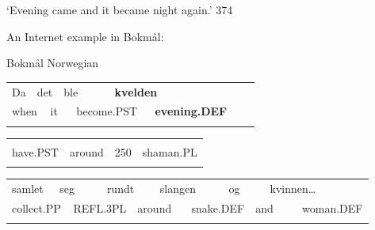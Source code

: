 \begin{styleTranslation}
‘Evening came and it became night again.’ 374

\end{styleTranslation}

An Internet example in Bokmål: 

\begin{listWWNumileveli}
\item 

\begin{styleExample}
Bokmål Norwegian

\end{styleExample}

\end{listWWNumileveli}

\begin{tabular}{llllllllll}
\lsptoprule
Da & \multicolumn{2}{l}{det

} & \multicolumn{2}{l}{ble

} & \multicolumn{2}{l}{{\bfseries kvelden}

} & \multicolumn{2}{l}{} & \\
\multicolumn{2}{l}{when

} & \multicolumn{2}{l}{it

} & \multicolumn{2}{l}{become.PST

} & \multicolumn{2}{l}{{\bfseries evening.DEF}

} & \multicolumn{2}{l}{}\\
\lspbottomrule
\end{tabular}

\begin{tabular}{llll}
\lsptoprule
\multicolumn{4}{l}{hadde

}\\
have.PST & around & 250 & shaman.PL\\
\lspbottomrule
\end{tabular}

\begin{tabular}{llllllllllll}
\lsptoprule
samlet & \multicolumn{2}{l}{seg

} & \multicolumn{2}{l}{rundt

} & \multicolumn{2}{l}{slangen

} & \multicolumn{2}{l}{og

} & \multicolumn{2}{l}{kvinnen…

} & \\
\multicolumn{2}{l}{collect.PP

} & \multicolumn{2}{l}{REFL.3PL

} & \multicolumn{2}{l}{around

} & \multicolumn{2}{l}{snake.DEF

} & \multicolumn{2}{l}{and

} & \multicolumn{2}{l}{woman.DEF

}\\
\lspbottomrule
\end{tabular}

